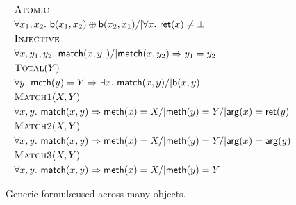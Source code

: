 \begin{figure}
  \footnotesize
  \begin{align*}
    & \textsc{Atomic} \\
    & \forall x_1,x_2.\ 
      {\sf b}(x_1,x_2) \oplus {\sf b}(x_2,x_1) /| \forall x.\ {\sf ret}(x) \neq \bot
    \\
    & \textsc{Injective} \\
    & \forall x, y_1, y_2.\ {\sf match}(x, y_1) /| {\sf match}(x, y_2) => y_1 = y_2
    \\
    & \textsc{Total}(Y) \\
    & \forall y.\ {\sf meth}(y) = Y => \exists x.\ {\sf match}(x,y) /| {\sf b}(x,y)
    \\
    & \textsc{Match1}(X,Y) \\
    & \forall x, y.\ {\sf match}(x,y) => 
        {\sf meth}(x) = X /| {\sf meth}(y) = Y /| {\sf arg}(x) = {\sf ret}(y)
    \\
    & \textsc{Match2}(X,Y) \\
    & \forall x, y.\ {\sf match}(x,y) => 
      {\sf meth}(x) = X /| {\sf meth}(y) = Y /| {\sf arg}(x) = {\sf arg}(y)
    \\
    & \textsc{Match3}(X,Y) \\
      & \forall x, y.\ 
        {\sf match}(x,y) => {\sf meth}(x) = X /| {\sf meth}(y) = Y
  \end{align*}
  \caption{Generic formul\ae used across many objects.}
  \label{fig:formulas:common}
\end{figure}

